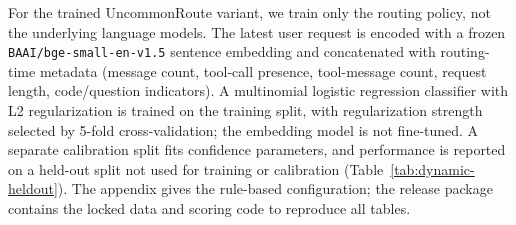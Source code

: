 For the trained UncommonRoute variant, we train only the routing policy,
not the underlying language models. The latest user request is encoded
with a frozen \texttt{BAAI/bge-small-en-v1.5} sentence embedding and
concatenated with routing-time metadata (message count, tool-call
presence, tool-message count, request length, code/question indicators).
A multinomial logistic regression classifier with L2 regularization is
trained on the training split, with regularization strength selected by
5-fold cross-validation; the embedding model is not fine-tuned. A
separate calibration split fits confidence parameters, and performance
is reported on a held-out split not used for training or calibration
(Table~\ref{tab:dynamic-heldout}). The appendix gives the rule-based
configuration; the release package contains the locked data and scoring
code to reproduce all tables.
